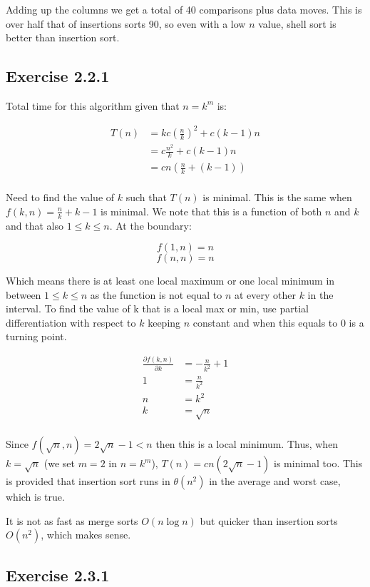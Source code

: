 \documentclass{article}
\begin{document}
Adding up the columns we get a total of 40 comparisons plus data moves. This is over half that of insertions sorts 90, so even with a low \(n\) value, shell sort is better than insertion sort.


\subsection*{Exercise 2.2.1}

Total time for this algorithm given that \(n=k^m\) is:

\begin{align*}
T(n) &=k c \left( \frac{n}{k} \right)^2 + c(k-1)n \\
&= c \frac{n^2}{k} + c(k-1)n \\ 
&= cn \left( \frac{n}{k} + (k-1) \right) \\ 
\end{align*}

Need to find the value of \(k\) such that \(T(n)\) is minimal. This is the same when \( f(k,n)=\frac{n}{k} + k-1 \) is minimal. We note that this is a function of both \(n\) and \(k\) and that also \(1 \leq k \leq n\). At the boundary:

\[f(1,n) = n\]
\[f(n,n) = n\]

Which means there is at least one local maximum or one local minimum in between \(1 \leq k \leq n\) as the function is not equal to \(n\) at every other \(k\) in the interval. To find the value of k that is a local max or min, use partial differentiation with respect to \(k\) keeping \(n\) constant and when this equals to 0 is a turning point.

\begin{align*}
\frac{\partial f(k,n)}{\partial k} &= -\frac{n}{k^2} + 1 \\
1&= \frac{n}{k^2} \\
n &= k^2 \\
k &= \sqrt{n} \\
\end{align*}

Since \(f(\sqrt{n},n) = 2\sqrt{n}-1 < n\) then this is a local minimum.
Thus, when \(k = \sqrt{n}\) (we set \(m=2\) in \(n=k^m\)), \(T(n) = cn(2\sqrt{n} -1)\) is minimal too. This is provided that insertion sort runs in \(\theta(n^2)\) in the average and worst case, which is true.

It is not as fast as merge sorts \(O(n\log{n})\) but quicker than insertion sorts \(O(n^2)\), which makes sense.


\subsection*{Exercise 2.3.1}
\end{document}
